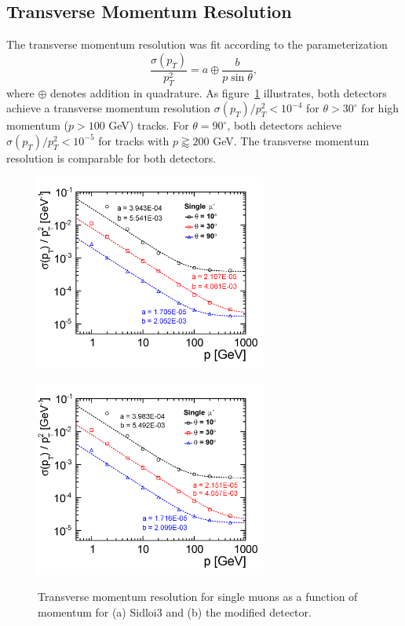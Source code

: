 \subsection{Transverse Momentum Resolution}
The transverse momentum resolution was fit according to the parameterization
\begin{equation}
\frac{\sigma(p_{T})}{p_{T}^{2}} = a \oplus \frac{b}{p\sin{\theta}},
\label{eq:pt}
\end{equation}
where $\oplus$ denotes addition in quadrature. 
As figure~\ref{fig:ptres} illustrates, both detectors achieve a transverse momentum resolution $\sigma(p_{T})/p_{T}^{2} < 10^{-4}$ 
for $\theta > 30^{\circ}$ for high momentum ($p > 100$  GeV) tracks.
For $\theta = 90^{\circ}$, both detectors achieve  $\sigma(p_{T})/p_{T}^{2} < 10^{-5}$ for tracks with $p \gtrapprox 200$ GeV.
The transverse momentum resolution is comparable for both detectors.
\begin{figure}[h!]
\begin{minipage}{.5\textwidth}
\centering
\includegraphics[width=3.0in]{sidloi3_muonPt2ResolutionP.png}
\label{fig:sidloi3ptres}
\end{minipage}
\begin{minipage}{.5\textwidth}
\centering
\includegraphics[width=3.0in]{det_vtxbar_3doublet_muonPt2ResolutionP.png}
\label{fig:det_vtxbar_3doubletptres}
\end{minipage}
\caption{Transverse momentum resolution for single muons as a function of momentum for (a) Sidloi3 and (b) the modified detector.}
\label{fig:ptres}
\end{figure}

